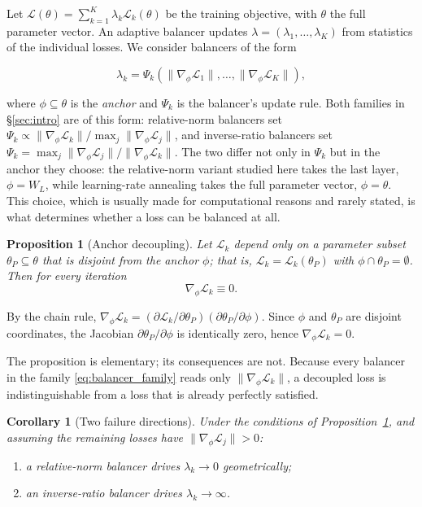 \documentclass[a4paper,fleqn]{cas-sc}
\newtheorem{proposition}{Proposition}
\newtheorem{corollary}{Corollary}
\begin{document}
Let $\mathcal{L}(\theta) = \sum_{k=1}^{K} \lambda_k \mathcal{L}_k(\theta)$ be
the training objective, with $\theta$ the full parameter vector. An adaptive
balancer updates $\lambda = (\lambda_1,\dots,\lambda_K)$ from statistics of the
individual losses. We consider balancers of the form

\begin{equation}
\lambda_k = \Psi_k\!\left(\|\nabla_\phi \mathcal{L}_1\|, \dots,
\|\nabla_\phi \mathcal{L}_K\|\right),
\label{eq:balancer_family}
\end{equation}

where $\phi \subseteq \theta$ is the \emph{anchor} and $\Psi_k$ is the
balancer's update rule. Both families in \S\ref{sec:intro} are of this form:
relative-norm balancers set $\Psi_k \propto \|\nabla_\phi \mathcal{L}_k\| /
\max_j \|\nabla_\phi \mathcal{L}_j\|$, and inverse-ratio balancers set
$\Psi_k = \max_j \|\nabla_\phi \mathcal{L}_j\| / \|\nabla_\phi \mathcal{L}_k\|$.
The two differ not only in $\Psi_k$ but in the anchor they choose: the
relative-norm variant studied here takes the last layer,
$\phi = W_L$, while learning-rate annealing takes the full parameter vector,
$\phi = \theta$. This choice, which is usually made for computational reasons
and rarely stated, is what determines whether a loss can be balanced at all.

\begin{proposition}[Anchor decoupling]
\label{prop:decoupling}
Let $\mathcal{L}_k$ depend only on a parameter subset $\theta_P \subseteq
\theta$ that is disjoint from the anchor $\phi$; that is,
$\mathcal{L}_k = \mathcal{L}_k(\theta_P)$ with
$\phi \cap \theta_P = \emptyset$. Then for every iteration
\[
\nabla_\phi \mathcal{L}_k \equiv 0 .
\]
\end{proposition}

\begin{pf}
By the chain rule, $\nabla_\phi \mathcal{L}_k =
(\partial \mathcal{L}_k/\partial \theta_P)(\partial \theta_P/\partial \phi)$.
Since $\phi$ and $\theta_P$ are disjoint coordinates, the Jacobian
$\partial \theta_P/\partial \phi$ is identically zero, hence
$\nabla_\phi \mathcal{L}_k = 0$.
\end{pf}

The proposition is elementary; its consequences are not. Because every
balancer in the family \eqref{eq:balancer_family} reads only
$\|\nabla_\phi \mathcal{L}_k\|$, a decoupled loss is indistinguishable from a
loss that is already perfectly satisfied.

\begin{corollary}[Two failure directions]
\label{cor:directions}
Under the conditions of Proposition~\ref{prop:decoupling}, and assuming the
remaining losses have $\|\nabla_\phi \mathcal{L}_j\| > 0$:
\begin{enumerate}
\item a relative-norm balancer drives $\lambda_k \to 0$ geometrically;
\item an inverse-ratio balancer drives $\lambda_k \to \infty$.
\end{enumerate}
\end{corollary}
\end{document}

